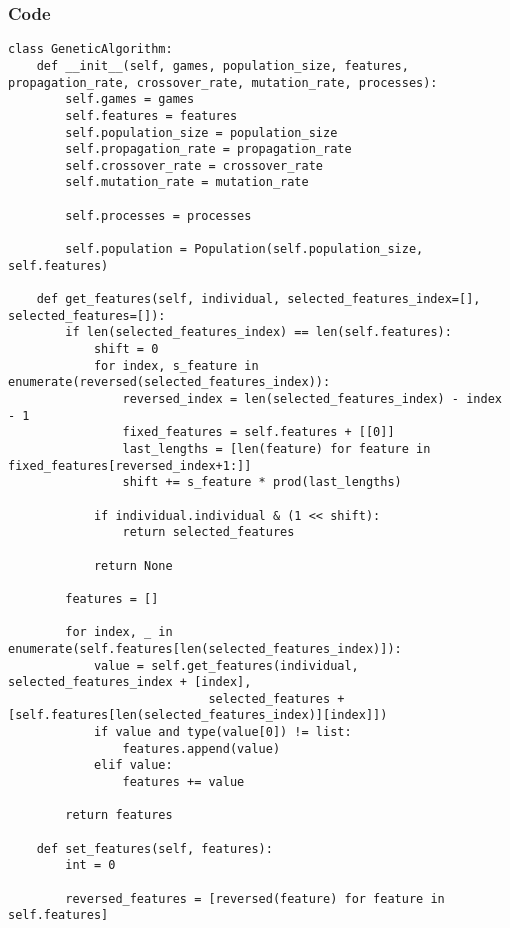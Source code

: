 \documentclass{beamer}
\begin{document}
\begin{frame}[fragile]
    \frametitle{Code}
    \fontsize{3pt}{5pt}\selectfont
    \begin{verbatim}
class GeneticAlgorithm:
    def __init__(self, games, population_size, features, propagation_rate, crossover_rate, mutation_rate, processes):
        self.games = games
        self.features = features
        self.population_size = population_size
        self.propagation_rate = propagation_rate
        self.crossover_rate = crossover_rate
        self.mutation_rate = mutation_rate
        
        self.processes = processes

        self.population = Population(self.population_size, self.features)

    def get_features(self, individual, selected_features_index=[], selected_features=[]):
        if len(selected_features_index) == len(self.features):
            shift = 0
            for index, s_feature in enumerate(reversed(selected_features_index)):
                reversed_index = len(selected_features_index) - index - 1
                fixed_features = self.features + [[0]]
                last_lengths = [len(feature) for feature in fixed_features[reversed_index+1:]]
                shift += s_feature * prod(last_lengths)

            if individual.individual & (1 << shift):
                return selected_features
            
            return None
        
        features = []

        for index, _ in enumerate(self.features[len(selected_features_index)]):
            value = self.get_features(individual, selected_features_index + [index],
                            selected_features + [self.features[len(selected_features_index)][index]])
            if value and type(value[0]) != list:
                features.append(value)
            elif value:
                features += value

        return features
    
    def set_features(self, features):
        int = 0

        reversed_features = [reversed(feature) for feature in self.features]
    \end{verbatim}
\end{frame}
\end{document}
